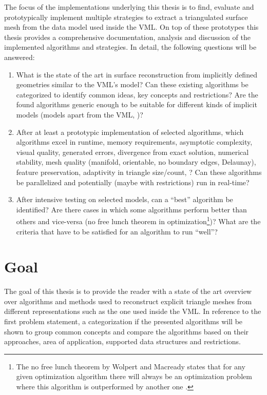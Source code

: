 The focus of the implementations underlying this thesis is to find, evaluate and prototypically implement multiple strategies to extract a triangulated surface mesh from the data model used inside the VML.
On top of these prototypes this thesis provides a comprehensive documentation, analysis and discussion of the implemented algorithms and strategies.
In detail, the following questions will be answered:

\begin{enumerate}
	\item What is the state of the art in surface reconstruction from implicitly defined geometries similar to the VML's model?
	Can these existing algorithms be categorized to identify common ideas, key concepts and restrictions?
	Are the found algorithms generic enough to be suitable for different kinds of implicit models (models apart from the VML, \cf)?
	
	\item After at least a prototypic implementation of selected algorithms, which algorithms excel in runtime, memory requirements, asymptotic complexity, visual quality, generated errors, divergence from exact solution, numerical stability, mesh quality (manifold, orientable, no boundary edges, Delaunay), feature preservation, adaptivity in triangle size/count, \etc? %
	Can these algorithms be parallelized and potentially (maybe with restrictions) run in real-time?
	
	\item After intensive testing on selected models, can a \enquote{best} algorithm be identified?
	Are there cases in which some algorithms perform better than others and vice-versa (\cf no free lunch theorem in optimization\footnote{The no free lunch theorem by Wolpert and Macready states that for any given optimization algorithm there will always be an optimization problem where this algorithm is outperformed by another one \cite{no_free_lunch}. })?
	What are the criteria that have to be satisfied for an algorithm to run \enquote{well}?
\end{enumerate}


\section{Goal}
\label{sec:goal}

The goal of this thesis is to provide the reader with a state of the art overview over algorithms and methods used to reconstruct explicit triangle meshes from different representations such as the one used inside the VML.
In reference to the first problem statement, a categorization if the presented algorithms will be shown to group common concepts and compare the algorithms based on their approaches, area of application, supported data structures and restrictions.

